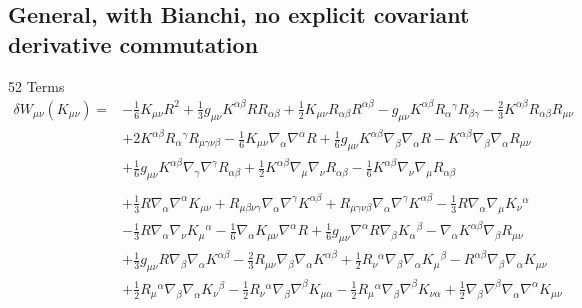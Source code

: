 \documentclass[10pt,letterpaper]{article}
\begin{document}
\subsection*{General, with Bianchi, no explicit covariant derivative commutation}
52 Terms
\begin{align}
\delta W_{\mu\nu}(K_{\mu\nu})={}&- \tfrac{1}{6} K_{\mu \nu} R^2
 + \tfrac{1}{3} g_{\mu \nu} K^{\alpha \beta} R R_{\alpha \beta}
 + \tfrac{1}{2} K_{\mu \nu} R_{\alpha \beta} R^{\alpha \beta}
 -  g_{\mu \nu} K^{\alpha \beta} R_{\alpha}{}^{\gamma} R_{\beta \gamma}
 -  \tfrac{2}{3} K^{\alpha \beta} R_{\alpha \beta} R_{\mu \nu}\nonumber\\
& + 2 K^{\alpha \beta} R_{\alpha}{}^{\gamma} R_{\mu \gamma \nu \beta}
 -  \tfrac{1}{6} K_{\mu \nu} \nabla_{\alpha}\nabla^{\alpha}R
 + \tfrac{1}{6} g_{\mu \nu} K^{\alpha \beta} \nabla_{\beta}\nabla_{\alpha}R
 -  K^{\alpha \beta} \nabla_{\beta}\nabla_{\alpha}R_{\mu \nu}\nonumber\\
& + \tfrac{1}{6} g_{\mu \nu} K^{\alpha \beta} \nabla_{\gamma}\nabla^{\gamma}R_{\alpha \beta}
 + \tfrac{1}{2} K^{\alpha \beta} \nabla_{\mu}\nabla_{\nu}R_{\alpha \beta}
 -  \tfrac{1}{6} K^{\alpha \beta} \nabla_{\nu}\nabla_{\mu}R_{\alpha \beta}\nonumber
\\\nonumber \\
&+\tfrac{1}{3} R \nabla_{\alpha}\nabla^{\alpha}K_{\mu \nu}
 + R_{\mu \beta \nu \gamma} \nabla_{\alpha}\nabla^{\gamma}K^{\alpha \beta}
 + R_{\mu \gamma \nu \beta} \nabla_{\alpha}\nabla^{\gamma}K^{\alpha \beta}
 -  \tfrac{1}{3} R \nabla_{\alpha}\nabla_{\mu}K_{\nu}{}^{\alpha}\nonumber\\
& -  \tfrac{1}{3} R \nabla_{\alpha}\nabla_{\nu}K_{\mu}{}^{\alpha}
 -  \tfrac{1}{6} \nabla_{\alpha}K_{\mu \nu} \nabla^{\alpha}R
 + \tfrac{1}{6} g_{\mu \nu} \nabla^{\alpha}R \nabla_{\beta}K_{\alpha}{}^{\beta}
 -  \nabla_{\alpha}K^{\alpha \beta} \nabla_{\beta}R_{\mu \nu}\nonumber\\
& + \tfrac{1}{3} g_{\mu \nu} R \nabla_{\beta}\nabla_{\alpha}K^{\alpha \beta}
 -  \tfrac{2}{3} R_{\mu \nu} \nabla_{\beta}\nabla_{\alpha}K^{\alpha \beta}
 + \tfrac{1}{2} R_{\nu}{}^{\alpha} \nabla_{\beta}\nabla_{\alpha}K_{\mu}{}^{\beta}
 -  R^{\alpha \beta} \nabla_{\beta}\nabla_{\alpha}K_{\mu \nu}\nonumber\\
& + \tfrac{1}{2} R_{\mu}{}^{\alpha} \nabla_{\beta}\nabla_{\alpha}K_{\nu}{}^{\beta}
 -  \tfrac{1}{2} R_{\nu}{}^{\alpha} \nabla_{\beta}\nabla^{\beta}K_{\mu \alpha}
 -  \tfrac{1}{2} R_{\mu}{}^{\alpha} \nabla_{\beta}\nabla^{\beta}K_{\nu \alpha}
 + \tfrac{1}{2} \nabla_{\beta}\nabla^{\beta}\nabla_{\alpha}\nabla^{\alpha}K_{\mu \nu}\nonumber\\

\end{align}
\end{document}
